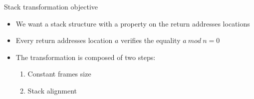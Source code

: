 \documentclass{beamer}
\begin{document}
\begin{frame}[c]{Stack transformation objective}
	\begin{itemize}\itemsep16pt
		\item We want a stack structure with a property on the return addresses locations
		\item Every return addresses location $a$ verifies the equality \underline{$a~mod~n=0$}
		\item The transformation is composed of two steps:
			\begin{enumerate}
				\item Constant frames size
				\item Stack alignment
			\end{enumerate}
	\end{itemize}
\end{frame}
\end{document}
